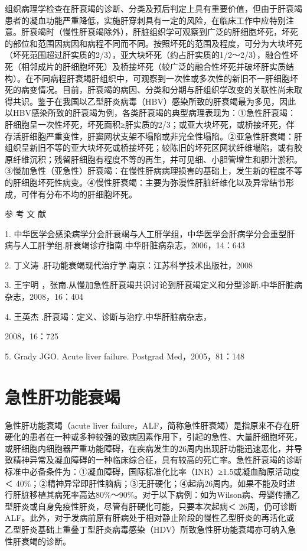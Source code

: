组织病理学检查在肝衰竭的诊断、分类及预后判定上具有重要价值，但由于肝衰竭患者的凝血功能严重降低，实施肝穿刺具有一定的风险，在临床工作中应特别注意。肝衰竭时（慢性肝衰竭除外），肝脏组织学可观察到广泛的肝细胞坏死，坏死的部位和范围因病因和病程不同而不同。按照坏死的范围及程度，可分为大块坏死（坏死范围超过肝实质的2/3），亚大块坏死（约占肝实质的1/2～2/3），融合性坏死（相邻成片的肝细胞坏死）及桥接坏死（较广泛的融合性坏死并破坏肝实质结构）。在不同病程肝衰竭肝组织中，可观察到一次性或多次性的新旧不一肝细胞坏死的病变情况。目前，肝衰竭的病因、分类和分期与肝组织学改变的关联性尚未取得共识。鉴于在我国以乙型肝炎病毒（HBV）感染所致的肝衰竭最为多见，因此以HBV感染所致的肝衰竭为例，各类肝衰竭的典型病理表现为：①急性肝衰竭：肝细胞呈一次性坏死，坏死面积≥肝实质的2/3；或亚大块坏死，或桥接坏死，伴存活肝细胞严重变性，肝窦网状支架不塌陷或非完全性塌陷。②亚急性肝衰竭：肝组织呈新旧不等的亚大块坏死或桥接坏死；较陈旧的坏死区网状纤维塌陷，或有胶原纤维沉积；残留肝细胞有程度不等的再生，并可见细、小胆管增生和胆汁淤积。③慢加急性（亚急性）肝衰竭：在慢性肝病病理损害的基础上，发生新的程度不等的肝细胞坏死性病变。④慢性肝衰竭：主要为弥漫性肝脏纤维化以及异常结节形成，可伴有分布不均的肝细胞坏死。

\hypertarget{text00081.htmlux5cux23CHP3-6-1-5}{}
参 考 文 献

1.
中华医学会感染病学分会肝衰竭与人工肝学组，中华医学会肝病学分会重型肝病与人工肝学组.肝衰竭诊疗指南.中华肝脏病杂志，2006，14：643

2. 丁义涛 .肝功能衰竭现代治疗学.南京：江苏科学技术出版社，2008

3. 王宇明
，张南.从慢加急性肝衰竭共识讨论到肝衰竭定义和分型诊断.中华肝脏病杂志，2008，16：404

4. 王英杰 .肝衰竭：定义、诊断与治疗.中华肝脏病杂志，

2008，16：725

5. Grady JGO. Acute liver failure. Postgrad Med，2005，81：148

\protect\hypertarget{text00082.html}{}{}

\section{急性肝功能衰竭}

急性肝功能衰竭（acute liver
failure，ALF，简称急性肝衰竭）是指原来不存在肝硬化的患者在一种或多种较强的致病因素作用下，引起的急性、大量肝细胞坏死，或肝细胞内细胞器严重功能障碍，在疾病发生的26周内出现肝功能迅速恶化，并导致精神异常及凝血障碍的一种临床综合征，具有较高的死亡率。急性肝衰竭的诊断标准中必备条件为：①凝血障碍，国际标准化比率（INR）≥1.5或凝血酶原活动度＜
40\%；②精神异常即肝性脑病；③无肝硬化；④起病26周内。如果不能及时进行肝脏移植其病死率高达80\%～90\%。对于以下病例：如为Wilson病、母婴传播乙型肝炎或自身免疫性肝炎，尽管有肝硬化可能，只要本次起病＜
26周，仍可诊断ALF。此外，对于发病前原有肝病处于相对静止阶段的慢性乙型肝炎的再活化或乙型肝炎基础上重叠丁型肝炎病毒感染（HDV）所致急性肝功能衰竭亦可纳入急性肝衰竭的诊断。

